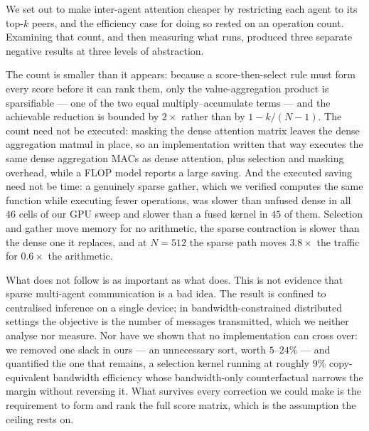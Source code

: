 We set out to make inter-agent attention cheaper by restricting each agent to
its top-$k$ peers, and the efficiency case for doing so rested on an operation
count. Examining that count, and then measuring what runs, produced three
separate negative results at three levels of abstraction.

The count is smaller than it appears: because a score-then-select rule must
form every score before it can rank them, only the value-aggregation product is
sparsifiable --- one of the two equal multiply--accumulate terms --- and the
achievable reduction is bounded by $2\times$ rather than by
$1-k/(N-1)$. The count need not be executed: masking the dense attention
matrix leaves the dense aggregation matmul in place, so an implementation
written that way executes the same dense aggregation MACs as dense attention,
plus selection and masking overhead, while a FLOP model reports a large saving.
And the executed saving need not be time: a genuinely sparse gather, which
we verified computes the same function while executing fewer operations, was
slower than unfused dense in all $46$ cells of our GPU sweep and slower than a
fused kernel in $45$ of them. Selection and gather move memory for no
arithmetic, the sparse contraction is slower than the dense one it replaces,
and at $N{=}512$ the sparse path moves $3.8\times$ the traffic for $0.6\times$
the arithmetic.

What does not follow is as important as what does. This is not evidence that
sparse multi-agent communication is a bad idea. The result is confined to
centralised inference on a single device; in bandwidth-constrained distributed
settings the objective is the number of messages transmitted, which we neither
analyse nor measure. Nor have we shown that no implementation can cross over:
we removed one slack in ours --- an unnecessary sort, worth $5$--$24\%$ --- and
quantified the one that remains, a selection kernel running at roughly $9\%$
copy-equivalent bandwidth efficiency whose bandwidth-only counterfactual
narrows the margin without reversing it. What survives every correction we
could make is the requirement to form and rank the full score matrix, which is
the assumption the ceiling rests on.

